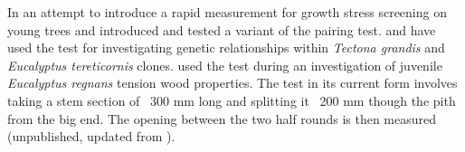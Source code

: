 In an attempt to introduce a rapid measurement for growth stress screening on young trees \citet{Chauhan_2010} and \citet{Entwistle_2014} introduced and tested a variant of the pairing test. \citet{naranjo2012early} and \citet{Aggarwal_2013} have used the test for investigating genetic relationships within \textit{Tectona grandis} and \textit{Eucalyptus tereticornis} clones. \citet{Chauhan_2011} used the test during an investigation of juvenile \textit{Eucalyptus regnans} tension wood properties. The test in its current form involves taking a stem section of ~300 mm long and splitting it ~200 mm though the pith from the big end. The opening between the two half rounds is then measured (unpublished, updated from \citet{Chauhan_2011}).  